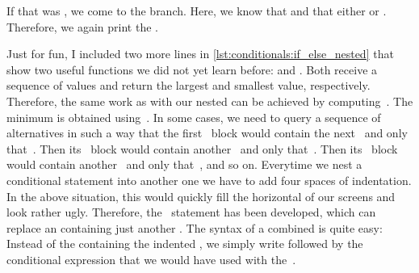 If that was , we come to the  branch.
Here, we know that  and that either  or .
Therefore, we again print the  .

Just for fun, I included two more lines in \cref{lst:conditionals:if_else_nested} that show two useful functions we did not yet learn before:
 and .
Both receive a sequence of values and return the largest and smallest value, respectively.
Therefore, the same work as with our nested  can be achieved by computing~.
The minimum is obtained using~.%
\FloatBarrier%
\endhsection%
%
%
%
In some cases, we need to query a sequence of alternatives in such a way that the first ~block would contain the next~ and only that~.
Then its ~block would contain another~ and only that~.
Then its ~block would contain another~ and only that~, and so on.
Everytime we nest a conditional statement into another one we have to add four spaces of indentation.
In the above situation, this would quickly fill the horizontal of our screens and look rather ugly.
Therefore, the ~statement has been developed, which can replace an  containing just another .
The syntax of a combined  is quite easy\cite{PSF:P3D:TPT:MCFT}:
Instead of the  containing the indented , we simply write  followed by the conditional expression that we would have used with the~.%
%
%
%
\FloatBarrier%
%
%
%
%
%
%
%
%
%
